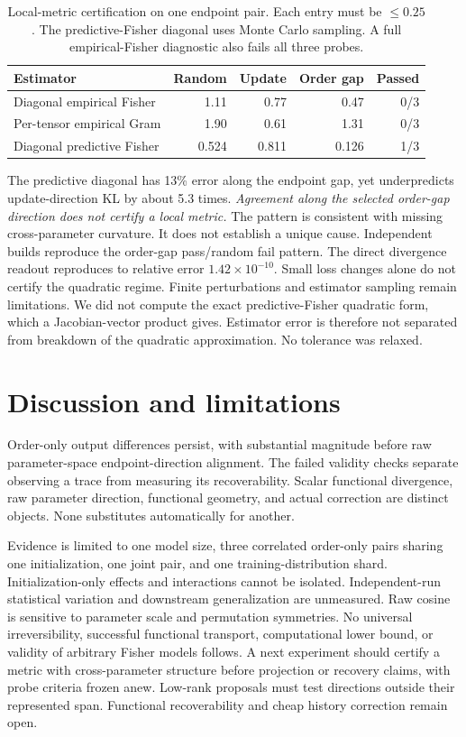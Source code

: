 \documentclass{article}
\begin{document}
\begin{table}[h]
\centering
\caption{Local-metric certification on one endpoint pair. Each entry must be $\leq0.25$. The predictive-Fisher diagonal uses Monte Carlo sampling. A full empirical-Fisher diagnostic also fails all three probes.}
\label{tab:fisher}
\begin{tabular}{lrrrr}
\toprule
Estimator & Random & Update & Order gap & Passed\\
\midrule
Diagonal empirical Fisher & 1.11 & 0.77 & 0.47 & 0/3\\
Per-tensor empirical Gram & 1.90 & 0.61 & 1.31 & 0/3\\
Diagonal predictive Fisher & 0.524 & 0.811 & 0.126 & 1/3\\
\bottomrule
\end{tabular}
\end{table}

The predictive diagonal has 13\% error along the endpoint gap, yet underpredicts update-direction KL by about 5.3 times. \emph{Agreement along the selected order-gap direction does not certify a local metric.} The pattern is consistent with missing cross-parameter curvature. It does not establish a unique cause. Independent builds reproduce the order-gap pass/random fail pattern. The direct divergence readout reproduces to relative error $1.42\times10^{-10}$. Small loss changes alone do not certify the quadratic regime. Finite perturbations and estimator sampling remain limitations. We did not compute the exact predictive-Fisher quadratic form, which a Jacobian-vector product gives. Estimator error is therefore not separated from breakdown of the quadratic approximation. No tolerance was relaxed.

\section{Discussion and limitations}
Order-only output differences persist, with substantial magnitude before raw parameter-space endpoint-direction alignment. The failed validity checks separate observing a trace from measuring its recoverability. Scalar functional divergence, raw parameter direction, functional geometry, and actual correction are distinct objects. None substitutes automatically for another.

Evidence is limited to one model size, three correlated order-only pairs sharing one initialization, one joint pair, and one training-distribution shard. Initialization-only effects and interactions cannot be isolated. Independent-run statistical variation and downstream generalization are unmeasured. Raw cosine is sensitive to parameter scale and permutation symmetries. No universal irreversibility, successful functional transport, computational lower bound, or validity of arbitrary Fisher models follows. A next experiment should certify a metric with cross-parameter structure before projection or recovery claims, with probe criteria frozen anew. Low-rank proposals must test directions outside their represented span. Functional recoverability and cheap history correction remain open.
\end{document}
